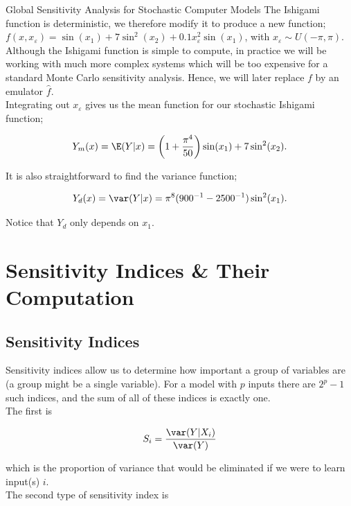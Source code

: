 \begin{chapter}{Global Sensitivity Analysis for Stochastic Computer Models}
The Ishigami function is deterministic, we therefore modify it to produce a new function; $f(x, x_\varepsilon) = \sin(x_1) + 7 \sin^2(x_2) + 0.1 x_\varepsilon^2 \sin(x_1)$, with $x_\varepsilon \sim U(-\pi, \pi)$. Although the Ishigami function is simple to compute, in practice we will be working with much more complex systems which will be too expensive for a standard Monte Carlo sensitivity analysis. Hence, we will later replace $f$ by an emulator $\hat{f}$.\\

Integrating out $x_\varepsilon$ gives us the mean function for our stochastic Ishigami function;

\begin{equation}
	Y_m(x) = \E(Y| x) = \left( 1 + \frac{\pi^4}{50} \right) \sin(x_1) + 7\sin^2(x_2).
\end{equation}

It is also straightforward to find the variance function;

\begin{equation}
	Y_d(x) = \var(Y|x) = \pi^8 (900^{-1} - 2500^{-1}) \sin^2(x_1).
\end{equation}

Notice that $Y_d$ only depends on $x_1$.

\section{Sensitivity Indices \& Their Computation}

\subsection{Sensitivity Indices}

Sensitivity indices allow us to determine how important a group of variables are (a group might be a single variable). For a model with $p$ inputs there are $2^p - 1$ such indices, and the sum of all of these indices is exactly one.\\

The first is 

\begin{equation}
	S_i = \frac{\var(Y|X_i)}{\var(Y)}
\end{equation}

which is the proportion of variance that would be eliminated if we were to learn input(s) $i$.\\

The second type of sensitivity index is 


\end{chapter}
